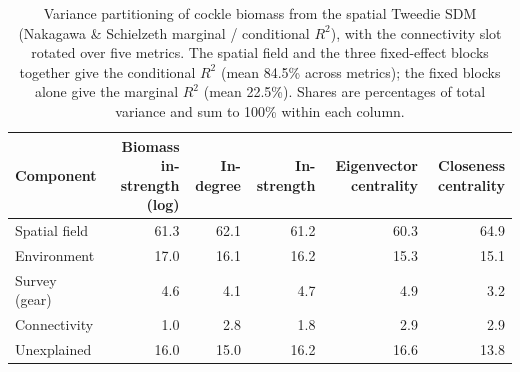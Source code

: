 \begin{table}[ht]
\centering
\caption{Variance partitioning of cockle biomass from the spatial Tweedie SDM (Nakagawa \& Schielzeth marginal / conditional $R^2$), with the connectivity slot rotated over five metrics. The spatial field and the three fixed-effect blocks together give the conditional $R^2$ (mean 84.5\% across metrics); the fixed blocks alone give the marginal $R^2$ (mean 22.5\%). Shares are percentages of total variance and sum to 100\% within each column.}
\label{tab:variance-partitioning}
\begin{tabular}{lrrrrr}
\toprule
Component & Biomass in-strength (log) & In-degree & In-strength & Eigenvector centrality & Closeness centrality \\
\midrule
Spatial field & 61.3 & 62.1 & 61.2 & 60.3 & 64.9 \\
Environment & 17.0 & 16.1 & 16.2 & 15.3 & 15.1 \\
Survey (gear) & 4.6 & 4.1 & 4.7 & 4.9 & 3.2 \\
Connectivity & 1.0 & 2.8 & 1.8 & 2.9 & 2.9 \\
\midrule
Unexplained & 16.0 & 15.0 & 16.2 & 16.6 & 13.8 \\
\bottomrule
\end{tabular}
\end{table}
